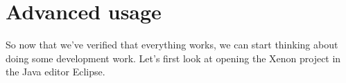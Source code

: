 \section{Advanced usage}

So now that we've verified that everything works, we can start thinking about doing some development work. Let's first look at opening the Xenon project in the Java editor Eclipse.
